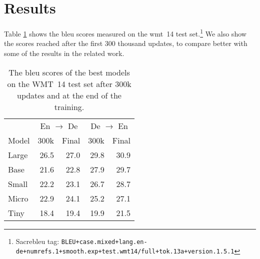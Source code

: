 \section{Results}%
\label{sec:results}

Table \ref{tab:wmt14-bleu-scores} shows the \acs{bleu} scores measured on the
\acs{wmt}~14 test set.\footnote{Sacrebleu tag: {\scriptsize
    \texttt{BLEU+case.mixed+lang.en-de+numrefs.1+smooth.exp+test.wmt14/full+tok.13a+version.1.5.1}}}
We also show the scores reached after the first 300 thousand updates, to
compare better with some of the results in the related work.

\begin{table}
  \centering

  \begin{tabular}{lrrrr}
    \toprule
    & \multicolumn{2}{c}{En $\rightarrow$ De}
    & \multicolumn{2}{c}{De $\rightarrow$ En} \\
    Model
    & 300k & Final & 300k & Final \\
    \midrule

    Large & 26.5 & 27.0 & 29.8 & 30.9 \\
    Base & 21.6 & 22.8 & 27.9 & 29.7 \\
    Small & 22.2 & 23.1 & 26.7 & 28.7 \\
    Micro & 22.9 & 24.1 & 25.2 & 27.1 \\
    Tiny & 18.4 & 19.4 & 19.9 & 21.5 \\
    \bottomrule
  \end{tabular}

  \caption{The \acs{bleu} scores of the best models on the WMT~14 test set
    after 300k updates and at the end of the training.}
  \label{tab:wmt14-bleu-scores}
\end{table}




